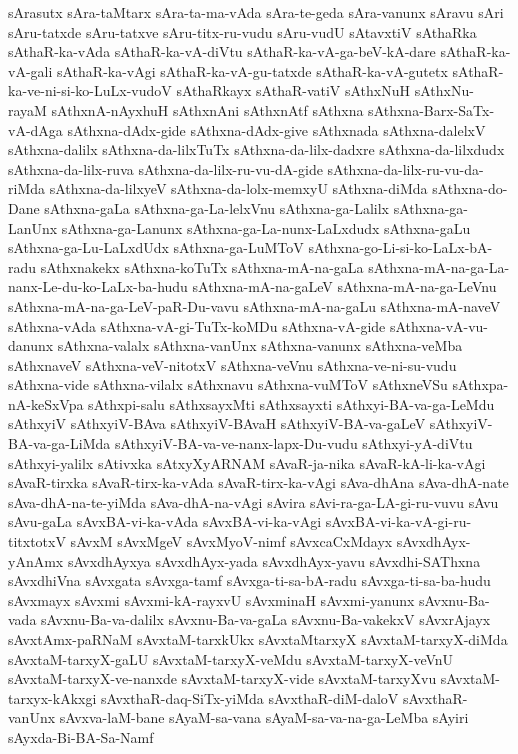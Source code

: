 {sArasutx
sAra-taMtarx
sAra-ta-ma-vAda
sAra-te-geda
sAra-vanunx
sAravu
sAri
sAru-tatxde
sAru-tatxve
sAru-titx-ru-vudu
sAru-vudU
sAtavxtiV
sAthaRka
sAthaR-ka-vAda
sAthaR-ka-vA-diVtu
sAthaR-ka-vA-ga-beV-kA-dare
sAthaR-ka-vA-gali
sAthaR-ka-vAgi
sAthaR-ka-vA-gu-tatxde
sAthaR-ka-vA-gutetx
sAthaR-ka-ve-ni-si-ko-LuLx-vudoV
sAthaRkayx
sAthaR-vatiV
sAthxNuH
sAthxNu-rayaM
sAthxnA-nAyxhuH
sAthxnAni
sAthxnAtf
sAthxna
sAthxna-Barx-SaTx-vA-dAga
sAthxna-dAdx-gide
sAthxna-dAdx-give
sAthxnada
sAthxna-dalelxV
sAthxna-dalilx
sAthxna-da-lilxTuTx
sAthxna-da-lilx-dadxre
sAthxna-da-lilxdudx
sAthxna-da-lilx-ruva
sAthxna-da-lilx-ru-vu-dA-gide
sAthxna-da-lilx-ru-vu-da-riMda
sAthxna-da-lilxyeV
sAthxna-da-lolx-memxyU
sAthxna-diMda
sAthxna-do-Dane
sAthxna-gaLa
sAthxna-ga-La-lelxVnu
sAthxna-ga-Lalilx
sAthxna-ga-LanUnx
sAthxna-ga-Lanunx
sAthxna-ga-La-nunx-LaLxdudx
sAthxna-gaLu
sAthxna-ga-Lu-LaLxdUdx
sAthxna-ga-LuMToV
sAthxna-go-Li-si-ko-LaLx-bA-radu
sAthxnakekx
sAthxna-koTuTx
sAthxna-mA-na-gaLa
sAthxna-mA-na-ga-La-nanx-Le-du-ko-LaLx-ba-hudu
sAthxna-mA-na-gaLeV
sAthxna-mA-na-ga-LeVnu
sAthxna-mA-na-ga-LeV-paR-Du-vavu
sAthxna-mA-na-gaLu
sAthxna-mA-naveV
sAthxna-vAda
sAthxna-vA-gi-TuTx-koMDu
sAthxna-vA-gide
sAthxna-vA-vu-danunx
sAthxna-valalx
sAthxna-vanUnx
sAthxna-vanunx
sAthxna-veMba
sAthxnaveV
sAthxna-veV-nitotxV
sAthxna-veVnu
sAthxna-ve-ni-su-vudu
sAthxna-vide
sAthxna-vilalx
sAthxnavu
sAthxna-vuMToV
sAthxneVSu
sAthxpa-nA-keSxVpa
sAthxpi-salu
sAthxsayxMti
sAthxsayxti
sAthxyi-BA-va-ga-LeMdu
sAthxyiV
sAthxyiV-BAva
sAthxyiV-BAvaH
sAthxyiV-BA-va-gaLeV
sAthxyiV-BA-va-ga-LiMda
sAthxyiV-BA-va-ve-nanx-lapx-Du-vudu
sAthxyi-yA-diVtu
sAthxyi-yalilx
sAtivxka
sAtxyXyARNAM
sAvaR-ja-nika
sAvaR-kA-li-ka-vAgi
sAvaR-tirxka
sAvaR-tirx-ka-vAda
sAvaR-tirx-ka-vAgi
sAva-dhAna
sAva-dhA-nate
sAva-dhA-na-te-yiMda
sAva-dhA-na-vAgi
sAvira
sAvi-ra-ga-LA-gi-ru-vuvu
sAvu
sAvu-gaLa
sAvxBA-vi-ka-vAda
sAvxBA-vi-ka-vAgi
sAvxBA-vi-ka-vA-gi-ru-titxtotxV
sAvxM
sAvxMgeV
sAvxMyoV-nimf
sAvxcaCxMdayx
sAvxdhAyx-yAnAmx
sAvxdhAyxya
sAvxdhAyx-yada
sAvxdhAyx-yavu
sAvxdhi-SAThxna
sAvxdhiVna
sAvxgata
sAvxga-tamf
sAvxga-ti-sa-bA-radu
sAvxga-ti-sa-ba-hudu
sAvxmayx
sAvxmi
sAvxmi-kA-rayxvU
sAvxminaH
sAvxmi-yanunx
sAvxnu-Ba-vada
sAvxnu-Ba-va-dalilx
sAvxnu-Ba-va-gaLa
sAvxnu-Ba-vakekxV
sAvxrAjayx
sAvxtAmx-paRNaM
sAvxtaM-tarxkUkx
sAvxtaMtarxyX
sAvxtaM-tarxyX-diMda
sAvxtaM-tarxyX-gaLU
sAvxtaM-tarxyX-veMdu
sAvxtaM-tarxyX-veVnU
sAvxtaM-tarxyX-ve-nanxde
sAvxtaM-tarxyX-vide
sAvxtaM-tarxyXvu
sAvxtaM-tarxyx-kAkxgi
sAvxthaR-daq-SiTx-yiMda
sAvxthaR-diM-daloV
sAvxthaR-vanUnx
sAvxva-laM-bane
sAyaM-sa-vana
sAyaM-sa-va-na-ga-LeMba
sAyiri
sAyxda-Bi-BA-Sa-Namf
}
